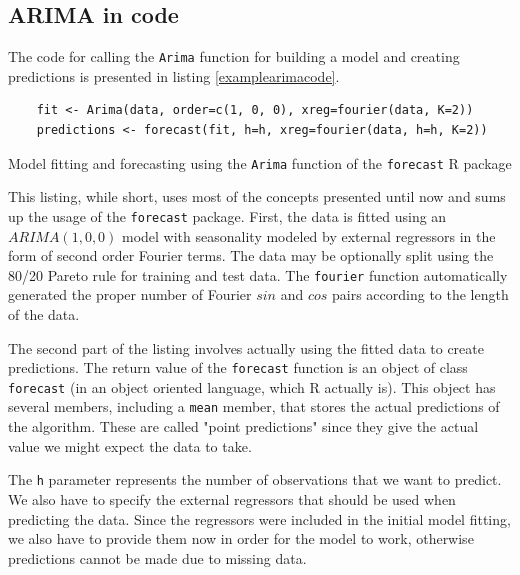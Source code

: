 \documentclass[12pt,a4paper,titlepage]{report}
\begin{document}

\subsection{ARIMA in code}
The code for calling the \texttt{Arima} function for building a model and creating predictions is presented in listing \ref{examplearimacode}.

\begin{listing}[h]
    \begin{verbatim}
    fit <- Arima(data, order=c(1, 0, 0), xreg=fourier(data, K=2))
    predictions <- forecast(fit, h=h, xreg=fourier(data, h=h, K=2))
    \end{verbatim}
    
    \caption{Model fitting and forecasting using the \texttt{Arima} function of the \texttt{forecast} R package}
    \label{examplearimacode}
\end{listing}

This listing, while short, uses most of the concepts presented until now and sums up the usage of the \texttt{forecast} package.
First, the data is fitted using an $ ARIMA(1, 0, 0) $ model with seasonality modeled by external regressors in the form of second order Fourier terms. The data may be optionally split using the 80/20 Pareto rule for training and test data. The \texttt{fourier} function automatically generated the proper number of Fourier $ sin $ and $ cos $ pairs according to the length of the data.

The second part of the listing involves actually using the fitted data to create predictions. The return value of the \texttt{forecast} function is an object of class \texttt{forecast} (in an object oriented language, which R actually is). This object has several members, including a \texttt{mean} member, that stores the actual predictions of the algorithm. These are called "point predictions" since they give the actual value we might expect the data to take.

The \texttt{h} parameter represents the number of observations that we want to predict. We also have to specify the external regressors that should be used when predicting the data. Since the regressors were included in the initial model fitting, we also have to provide them now in order for the model to work, otherwise predictions cannot be made due to missing data.
\end{document}
